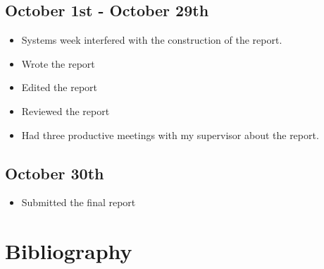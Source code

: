 \documentclass[12pt]{article}
\begin{document}
\subsection{October 1st - October 29th}
\begin{itemize}
	\item Systems week interfered with the construction of the report.
	\item Wrote the report
	\item Edited the report
	\item Reviewed the report
	\item Had three productive meetings with my supervisor about the report.
\end{itemize}
\subsection{October 30th}
\begin{itemize}
	\item Submitted the final report
\end{itemize}
\section{Bibliography}
\printbibliography
\end{document}
